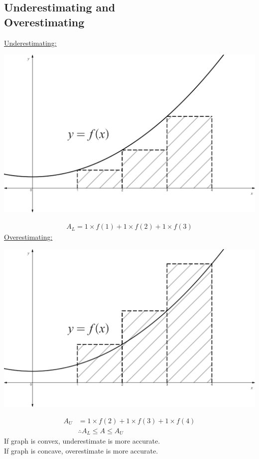 \documentclass[10pt, a4paper, titlepage]{article}
\begin{document}
\begin{multicols*}{3}
	\subsection{Underestimating and \\Overestimating}
	\underline{Underestimating:}\\
	\begin{center}
		\includegraphics[width=0.9\linewidth]{underestimate.png}\\
	\end{center}
	\begin{align}
		A_L=1\times f(1)+1\times f(2)+1\times f(3)
	\end{align}
	\underline{Overestimating:}\\
	\begin{center}
		\includegraphics[width=0.9\linewidth]{overestimate.png}\\
	\end{center}
	\begin{align}
		A_U&=1\times f(2)+1\times f(3)+1\times f(4)\\
		&\therefore A_L\leq A\leq A_U
	\end{align}
	If graph is convex, underestimate is more accurate.\\
	If graph is concave, overestimate is more accurate.\\


\end{multicols*}
\end{document}
